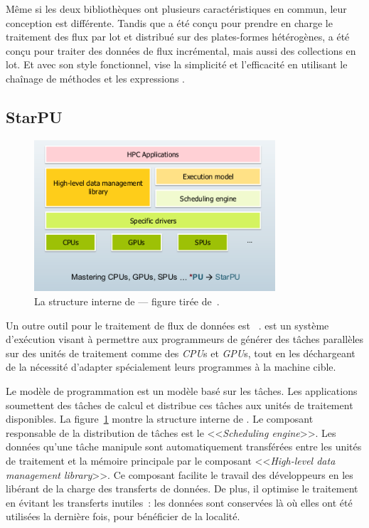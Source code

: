 M\^eme si les deux biblioth\`eques ont plusieurs caract\'eristiques en commun, leur conception est diff\'erente. Tandis que  a \'et\'e conçu pour prendre en charge le traitement des flux par lot et distribu\'e sur des plates-formes h\'et\'erog\`enes,  a \'et\'e conçu pour traiter des donn\'ees de flux incr\'emental, mais aussi des collections en lot. Et avec son style fonctionnel,  vise la simplicit\'e et l'efficacit\'e en utilisant le cha\^inage de m\'ethodes et les expressions .



\subsection{StarPU} 

\begin{figure}
\centering
     \includegraphics[width=0.8\textwidth]{Figures/StarPUInternalStructure.png}
      \caption[La structure interne de .]{ La structure interne de  --- figure tir\'ee de~\citep{starPuRuntime}.}
       \label{StarPUInternalStructure.fig}
\end{figure}


Un outre outil pour le traitement de flux de donn\'ees est ~\citep{starPuReferenceEnLigne}.   est un syst\`eme d'ex\'ecution visant \`a permettre aux programmeurs de g\'en\'erer des t\^aches parall\`eles sur des unit\'es de traitement comme  des \emph{CPU}s et \emph{GPU}s, tout en les d\'echargeant de la n\'ecessit\'e d'adapter sp\'ecialement leurs programmes \`a la machine cible.


Le mod\`ele de programmation  est un mod\`ele bas\'e sur les t\^aches. Les applications soumettent des t\^aches de calcul et  distribue ces t\^aches aux unit\'es de traitement disponibles. La figure~\ref{StarPUInternalStructure.fig} montre la structure interne de . Le composant responsable de la distribution de t\^aches est le <<\emph{Scheduling engine}>>. Les donn\'ees qu'une t\^ache manipule sont automatiquement transf\'er\'ees entre les unit\'es de traitement et la m\'emoire principale par le composant <<\emph{High-level data management library}>>. Ce composant facilite le travail des d\'eveloppeurs en les lib\'erant de la charge des transferts de donn\'ees. De plus, il optimise le traitement en \'evitant les transferts inutiles~: les donn\'ees sont conserv\'ees l\`a o\`u elles ont été utilisées la derni\`ere fois, pour bénéficier de la localité.

